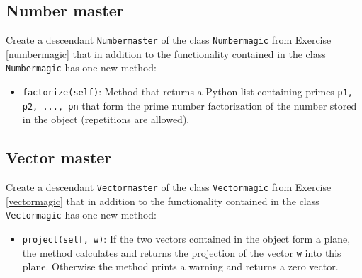 
\subsection{Number master}

Create a descendant {\tt Numbermaster} of the class {\tt Numbermagic} from Exercise \ref{numbermagic}
that in addition to the functionality contained in the class {\tt Numbermagic} has one new
method:
\begin{itemize}
\item {\tt factorize(self)}: Method that returns a Python list containing primes {\tt p1, p2, ..., pn}
      that form the prime number factorization of the number stored in the object (repetitions are 
      allowed).
\end{itemize}


\subsection{Vector master}

Create a descendant {\tt Vectormaster} of the class {\tt Vectormagic} from Exercise \ref{vectormagic}
that in addition to the functionality contained in the class {\tt Vectormagic} has one new
method:
\begin{itemize}
\item {\tt project(self, w)}: If the two vectors contained in the object form a plane, the 
      method calculates and returns the projection of the vector {\tt w} into this plane. 
      Otherwise the method prints a warning and returns a zero vector. 
\end{itemize}
